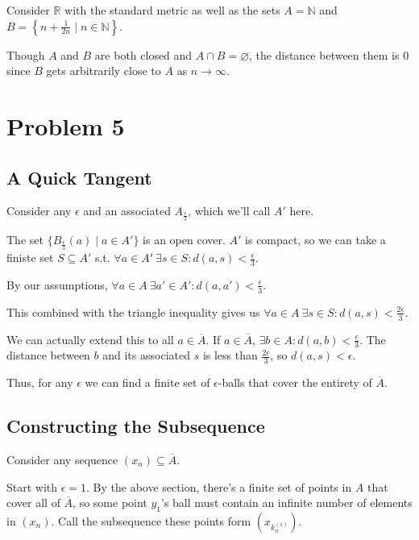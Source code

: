 \documentclass[12pt]{article}
\newcommand{\N}{\mathbb{N}}
\newcommand{\R}{\mathbb{R}}
\begin{document}
Consider $\R$ with the standard metric as well as the sets $A=\N$ and $B=\left\{n+\frac{1}{2n} \mid n \in \N\right\}$.

Though $A$ and $B$ are both closed and $A \cap B = \varnothing$, the distance
between them is $0$ since $B$ gets arbitrarily close to $A$ as $n \to \infty$.

\pagebreak

\section{Problem 5}

\subsection{A Quick Tangent}

Consider any $\epsilon$ and an associated $A_{\frac{\epsilon}{3}}$, which we'll call $A'$ here.

The set $\{B_{\frac{\epsilon}{3}}(a) \mid a \in A'\}$ is an open cover.
$A'$ is compact, so we can take a finiste set $S \subseteq A'$
s.t. $\forall a \in A'\ \exists s \in S: d(a, s) < \frac{\epsilon}{3}$.

By our assumptions, $\forall a \in A\ \exists a' \in A': d(a, a') < \frac{\epsilon}{3}$.

This combined with the triangle inequality gives us
$\forall a \in A\ \exists s \in S: d(a, s) < \frac{2\epsilon}{3}$.

We can actually extend this to all $a \in \overline{A}$.
If $a \in \overline{A}$, $\exists b \in A: d(a, b) < \frac{\epsilon}{3}$.
The distance between $b$ and its associated $s$ is less than $\frac{2\epsilon}{3}$, so $d(a, s) < \epsilon$.

Thus, for any $\epsilon$ we can find a finite set of $\epsilon$-balls that cover the entirety of $\overline{A}$.

\subsection{Constructing the Subsequence}

Consider any sequence $(x_n) \subseteq \overline{A}$.

Start with $\epsilon=1$.
By the above section, there's a finite set of points in $A$ that cover all of $\overline{A}$,
so some point $y_1$'s ball must contain an infinite number of elements in $(x_n)$.
Call the subsequence these points form $(x_{k^{(1)}_n})$.
\end{document}
